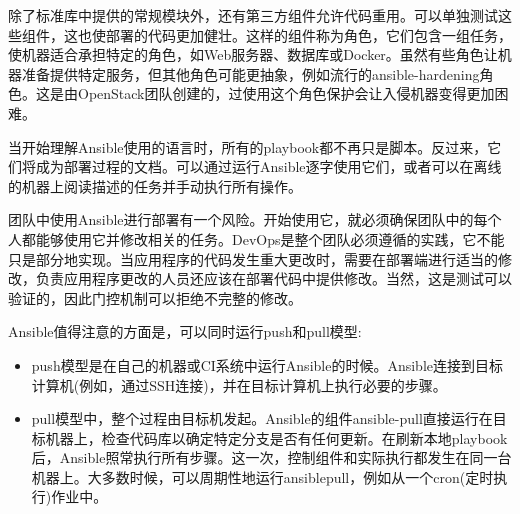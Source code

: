 
除了标准库中提供的常规模块外，还有第三方组件允许代码重用。可以单独测试这些组件，这也使部署的代码更加健壮。这样的组件称为角色，它们包含一组任务，使机器适合承担特定的角色，如Web服务器、数据库或Docker。虽然有些角色让机器准备提供特定服务，但其他角色可能更抽象，例如流行的ansible-hardening角色。这是由OpenStack团队创建的，过使用这个角色保护会让入侵机器变得更加困难。

当开始理解Ansible使用的语言时，所有的playbook都不再只是脚本。反过来，它们将成为部署过程的文档。可以通过运行Ansible逐字使用它们，或者可以在离线的机器上阅读描述的任务并手动执行所有操作。

团队中使用Ansible进行部署有一个风险。开始使用它，就必须确保团队中的每个人都能够使用它并修改相关的任务。DevOps是整个团队必须遵循的实践，它不能只是部分地实现。当应用程序的代码发生重大更改时，需要在部署端进行适当的修改，负责应用程序更改的人员还应该在部署代码中提供修改。当然，这是测试可以验证的，因此门控机制可以拒绝不完整的修改。 

Ansible值得注意的方面是，可以同时运行push和pull模型:

\begin{itemize}
\item 
push模型是在自己的机器或CI系统中运行Ansible的时候。Ansible连接到目标计算机(例如，通过SSH连接)，并在目标计算机上执行必要的步骤。

\item 
pull模型中，整个过程由目标机发起。Ansible的组件ansible-pull直接运行在目标机器上，检查代码库以确定特定分支是否有任何更新。在刷新本地playbook后，Ansible照常执行所有步骤。这一次，控制组件和实际执行都发生在同一台机器上。大多数时候，可以周期性地运行ansiblepull，例如从一个cron(定时执行)作业中。
\end{itemize}















